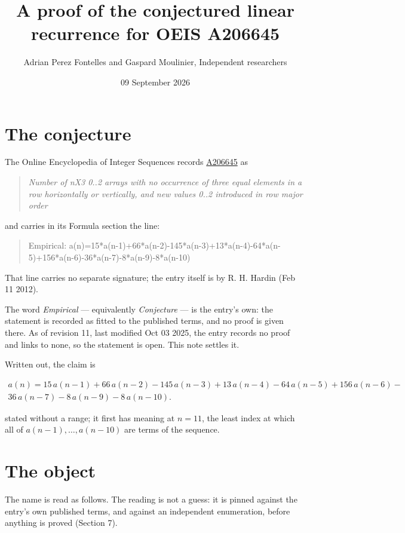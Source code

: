 \documentclass[11pt]{article}
\title{A proof of the conjectured linear recurrence for OEIS A206645}
\author{Adrian Perez Fontelles and Gaspard Moulinier, Independent researchers}
\date{09 September 2026}
\theoremstyle{definition}
\begin{document}
\maketitle
\section{The conjecture}

The Online Encyclopedia of Integer Sequences records \href{https://oeis.org/A206645}{A206645} as

\begin{quote}\itshape Number of nX3 0..2 arrays with no occurrence of three equal elements in a row horizontally or vertically, and new values 0..2 introduced in row major order\end{quote}

and carries in its Formula section the line:

\begin{quote}\ttfamily Empirical: a(n)=15*a(n-1)+66*a(n-2)-145*a(n-3)+13*a(n-4)-64*a(n-5)+156*a(n-6)-36*a(n-7)-8*a(n-9)-8*a(n-10)\end{quote}

That line carries no separate signature; the entry itself is by R. H. Hardin (Feb 11 2012).

The word {\itshape Empirical} --- equivalently {\itshape Conjecture} --- is the entry's own: the statement is recorded as fitted to the published terms, and no proof is given there. As of revision 11, last modified Oct 03 2025, the entry records no proof and links to none, so the statement is open. This note settles it.

Written out, the claim is

\begin{multline*} a(n) = 15\,a(n-1) + 66\,a(n-2) - 145\,a(n-3) + 13\,a(n-4) - 64\,a(n-5) + 156\,a(n-6) - \\ 36\,a(n-7) - 8\,a(n-9) - 8\,a(n-10). \end{multline*}

stated without a range; it first has meaning at $n = 11$, the least index at which all of $a(n-1),\dots,a(n-10)$ are terms of the sequence.

\section{The object}

The name is read as follows. The reading is not a guess: it is pinned against the entry's own published terms, and against an independent enumeration, before anything is proved (Section 7).
\end{document}
